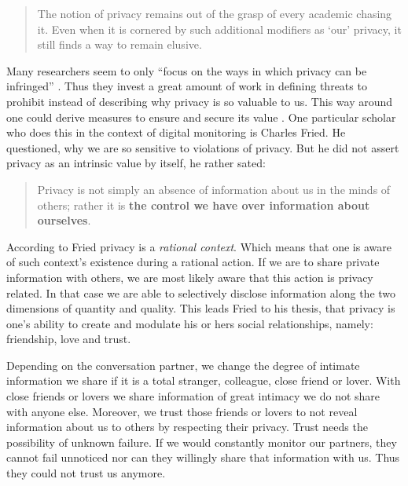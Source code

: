\begin{quote}
The notion of privacy remains out of the grasp of every academic chasing it. Even when it is cornered by such additional modifiers as `our' privacy, it still finds a way to remain elusive. \cite{Gutwirth}
\end{quote}


Many researchers seem to only ``focus on the ways in which privacy can be infringed'' \cite{7ToP}.
Thus they invest a great amount of work in defining threats to prohibit instead of describing why privacy is so valuable to us.
This way around one could derive measures to ensure and secure its value \cite{7ToP}.
One particular scholar who does this in the context of digital monitoring is Charles Fried.
He questioned, why we are so sensitive to violations of privacy.
But he did not assert privacy as an intrinsic value by itself, he rather sated:

\begin{quote}
Privacy is not simply an absence of information about us in the minds of others;
rather it is \textbf{the control we have over information about ourselves}. \cite{CFried:Privacy}
\end{quote}

According to Fried privacy is a \textit{rational context}.
Which means that one is aware of such context's existence during a rational action.
If we are to share private information with others, we are most likely aware that this action is privacy related.
In that case we are able to selectively disclose information along the two dimensions of quantity and quality.
This leads Fried to his thesis, that privacy is one's ability to create and modulate his or hers social relationships, namely: friendship, love and trust. \cite{CFried:Privacy}

Depending on the conversation partner, we change the degree of intimate information we share if it is a total stranger, colleague, close friend or lover.
With close friends or lovers we share information of great intimacy we do not share with anyone else.
Moreover, we trust those friends or lovers to not reveal information about us to others by respecting their privacy.
Trust needs the possibility of unknown failure.
If we would constantly monitor our partners, they cannot fail unnoticed nor can they willingly share that information with us.
Thus they could not trust us anymore. \cite{CFried:Privacy}


